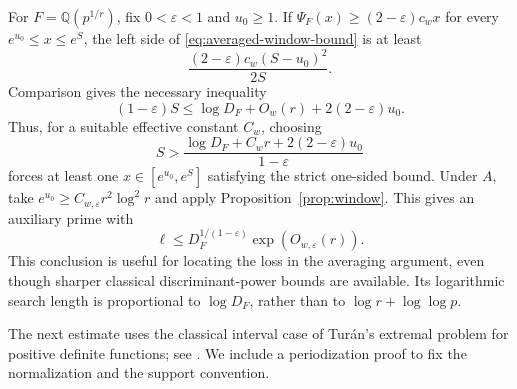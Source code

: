 \documentclass[11pt]{article}
\theoremstyle{definition}
\theoremstyle{remark}
\begin{document}
For $F=\mathbb Q(p^{1/r})$, fix $0<\varepsilon<1$ and $u_0\geq1$.
If $\Psi_F(x)\geq(2-\varepsilon)c_wx$ for every
$e^{u_0}\leq x\leq e^S$, the left side of
\eqref{eq:averaged-window-bound} is at least
\[
 \frac{(2-\varepsilon)c_w(S-u_0)^2}{2S}.
\]
Comparison gives the necessary inequality
\begin{equation}\label{eq:window-scale-obstruction}
 (1-\varepsilon)S
 \leq\log D_F+O_w(r)+2(2-\varepsilon)u_0.
\end{equation}
Thus, for a suitable effective constant $C_w$, choosing
\[
 S>\frac{\log D_F+C_wr+2(2-\varepsilon)u_0}{1-\varepsilon}
\]
forces at least one $x\in[e^{u_0},e^S]$ satisfying the strict
one-sided bound.  Under $A$, take
$e^{u_0}\geq C_{w,\varepsilon}r^2\log^2r$ and apply
Proposition~\ref{prop:window}.  This gives an auxiliary prime with
\begin{equation}\label{eq:averaged-auxiliary-bound}
 \ell\leq D_F^{1/(1-\varepsilon)}
                  \exp(O_{w,\varepsilon}(r)).
\end{equation}
This conclusion is useful for locating the loss in the averaging
argument, even though sharper classical discriminant-power bounds are
available.  Its logarithmic search length is proportional to
$\log D_F$, rather than to $\log r+\log\log p$.

The next estimate uses the classical interval case of Tur\'an's
extremal problem for positive definite functions; see
\citet[author version, Theorem~6, equation~(29), p.~14,
and Remark~4, p.~15]{KR2006Turan}.  We include a periodization
proof to fix the normalization and the support convention.
\end{document}
